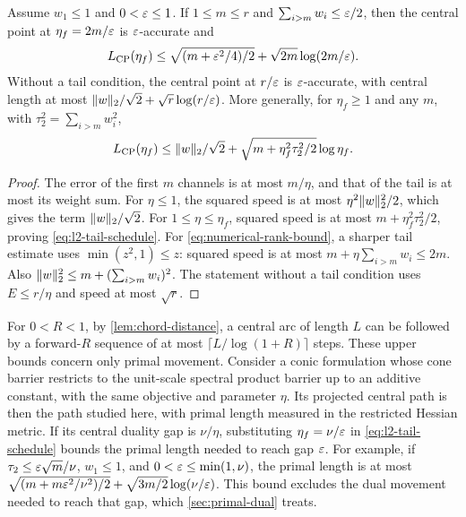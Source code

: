 \begin{corollary}
\label{cor:numerical-rank}
Assume $w_1\leq1$ and $0<\varepsilon\leq1$. If $1\leq m\leq r$ and
$\sum_{i>m}w_i\leq\varepsilon/2$, then the central point at $\eta_f=2m/\varepsilon$ is
$\varepsilon$-accurate and
\begin{equation}
 L_{\mathrm{CP}}(\eta_f)\leq
 \sqrt{(m+\varepsilon^2/4)/2}+\sqrt{2m}\log(2m/\varepsilon).
 \label{eq:numerical-rank-bound}
\end{equation}
Without a tail condition, the central point at $r/\varepsilon$ is
$\varepsilon$-accurate, with central length at most
$\lVert w\rVert_2/\sqrt2+\sqrt r\log(r/\varepsilon)$.
More generally, for $\eta_f\geq1$ and any $m$, with
$\tau_2^2=\sum_{i>m}w_i^2$,
\begin{equation}
 L_{\mathrm{CP}}(\eta_f)\leq\lVert w\rVert_2/\sqrt2+
        \sqrt{m+\eta_f^2\tau_2^2/2}\log\eta_f.
 \label{eq:l2-tail-schedule}
\end{equation}
\end{corollary}
\begin{proof}
The error of the first $m$ channels is at most $m/\eta$, and that of
the tail is at most its weight sum. For $\eta\leq1$, the squared speed
is at most $\eta^2\lVert w\rVert_2^2/2$, which gives the term
$\lVert w\rVert_2/\sqrt2$.
For $1\leq\eta\leq\eta_f$, squared speed is at most
$m+\eta_f^2\tau_2^2/2$, proving \eqref{eq:l2-tail-schedule}.
For \eqref{eq:numerical-rank-bound}, a sharper tail estimate uses
$\min(z^2,1)\leq z$: squared speed is at most
$m+\eta\sum_{i>m}w_i\leq2m$. Also
$\lVert w\rVert_2^2\leq m+(\sum_{i>m}w_i)^2$.
The statement without a tail condition uses $E\leq r/\eta$ and speed
at most $\sqrt r$.
\end{proof}
For $0<R<1$, by \cref{lem:chord-distance}, a central arc of length $L$
can be followed by a forward-$R$ sequence of at most
$\lceil L/\log(1+R)\rceil$ steps.
These upper bounds concern only primal movement. Consider a conic
formulation whose cone barrier restricts to the unit-scale spectral
product barrier up to an additive constant, with the same objective and
parameter $\eta$. Its projected central path is then the path studied
here, with primal length measured in the restricted Hessian metric. If
its central duality gap is $\nu/\eta$, substituting
$\eta_f=\nu/\varepsilon$ in \eqref{eq:l2-tail-schedule} bounds the primal
length needed to reach gap $\varepsilon$. For example, if
$\tau_2\leq\varepsilon\sqrt m/\nu$, $w_1\leq1$, and $0<\varepsilon\leq\min(1,\nu)$,
the primal length is at most
$\sqrt{(m+m\varepsilon^2/\nu^2)/2}+\sqrt{3m/2}\log(\nu/\varepsilon)$.
This bound excludes the dual movement needed to reach that gap, which
\cref{sec:primal-dual} treats.

